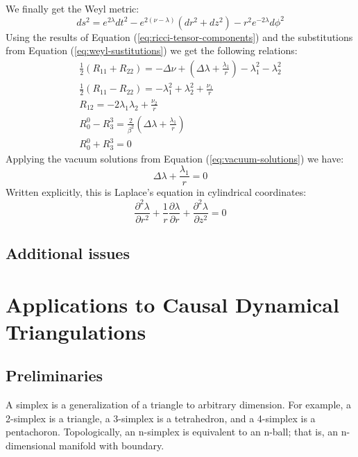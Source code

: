 \documentclass{article}
\begin{document}
We finally get the Weyl metric:
\begin{equation}
ds^{2}=e^{2\lambda}dt^{2}-e^{2\left(\nu-\lambda\right)}\left(dr^{2}+dz^{2}\right)-r^{2}e^{-2\lambda}d\phi^{2}
\end{equation}
Using the results of Equation (\ref{eq:ricci-tensor-components}) and the substitutions from Equation (\ref{eq:weyl-sustitutions}) we get the following relations:
\begin{equation}
\begin{array}{l}
\frac{1}{2}\left(R_{11}+R_{22}\right)=-\Delta\nu+\left(\Delta\lambda+\frac{\lambda_{1}}{r}\right)-\lambda^{2}_{1}-\lambda^{2}_{2} \\
\frac{1}{2}\left(R_{11}-R_{22}\right)=-\lambda^{2}_{1}+\lambda^{2}_{2}+\frac{\nu_{1}}{r}\\
R_{12}=-2\lambda_{1}\lambda_{2}+\frac{\nu_{2}}{r}\\
R_{0}^{0}-R_{3}^{3}=\frac{2}{\beta^{2}}\left(\Delta\lambda+\frac{\lambda_{1}}{r}\right)\\
R_{0}^{0}+R_{3}^{3}=0
\end{array}
\end{equation}
Applying the vacuum solutions from Equation (\ref{eq:vacuum-solutions}) we have:
\begin{equation}
\Delta\lambda+\frac{\lambda_{1}}{r}=0
\end{equation}
Written explicitly, this is Laplace's equation in cylindrical coordinates:
\begin{equation}
\frac{\partial^{2}\lambda}{\partial r^{2}}+\frac{1}{r}\frac{\partial\lambda}{\partial r}+\frac{\partial^{2}\lambda}{\partial z^{2}}=0
\end{equation}
\subsection{Additional issues}



\section{Applications to Causal Dynamical Triangulations}

\subsection{Preliminaries}

A simplex is a generalization of a triangle to arbitrary dimension. For example, a 2-simplex is a triangle, a 3-simplex is a tetrahedron, and a 4-simplex is a pentachoron. Topologically, an n-simplex is equivalent to an n-ball; that is, an n-dimensional manifold with boundary.
\end{document}
